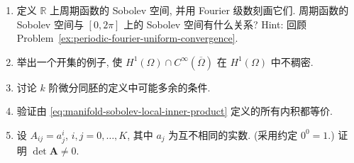 \begin{enumerate}[label=\thesection.\arabic*.,ref=\thesection.\arabic*,start=1,series=book-problems]
\item\label{ex:periodic-sobolev-spaces-fourier-characterization} 定义 $\mathbb{R}$ 上周期函数的 Sobolev 空间, 并用 Fourier 级数刻画它们. 周期函数的 Sobolev 空间与 $[0,2\pi]$ 上的 Sobolev 空间有什么关系? Hint: 回顾 Problem~\ref{ex:periodic-fourier-uniform-convergence}.

\item\label{ex:boundary-smooth-functions-not-dense-open-set-example} 举出一个开集的例子, 使 $H^1(\Omega)\cap C^{\infty}(\overline\Omega)$ 在 $H^1(\Omega)$ 中不稠密.

\item\label{ex:k-diffeomorphism-definition-redundancies} 讨论 $k$ 阶微分同胚的定义中可能多余的条件.

\item\label{ex:manifold-sobolev-inner-products-equivalence} 验证由 \eqref{eq:manifold-sobolev-local-inner-product} 定义的所有内积都等价.

\item\label{ex:vandermonde-matrix-nonsingularity} 设 $A_{ij}=a_j^i$, $i,j=0,\ldots,K$, 其中 $a_j$ 为互不相同的实数. (采用约定 $0^0=1$.) 证明 $\det\bm{A}\ne0$.

\end{enumerate}
